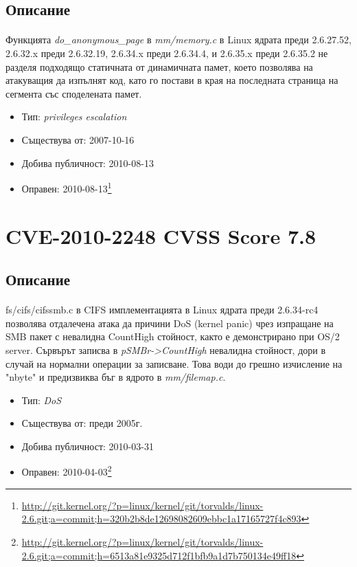 \documentclass[a4paper,12pt,leqno]{article}
\begin{document}
\subsection{Описание}
\paragraph{}
Функцията \textit{do\_anonymous\_page} в \textit{mm/memory.c} в Linux ядрата преди 2.6.27.52, 2.6.32.x преди 2.6.32.19, 2.6.34.x преди 2.6.34.4, и 2.6.35.x преди 2.6.35.2 не разделя подходящо статичната от динамичната памет, което позволява на атакуващия да изпълнят код, като го постави в края на последната страница на сегмента със споделената памет.

\begin{itemize}
    \item Тип: \textit{privileges escalation}
    \item Съществува от: 2007-10-16
  	\item Добива публичност: 2010-08-13
    \item Оправен: 2010-08-13\footnote{\url{http://git.kernel.org/?p=linux/kernel/git/torvalds/linux-2.6.git;a=commit;h=320b2b8de12698082609ebbc1a17165727f4c893}}
\end{itemize}

\section{CVE-2010-2248 CVSS Score 7.8}
\subsection{Описание}
\paragraph{}
fs/cifs/cifssmb.c в CIFS имплементацията в Linux ядрата преди 2.6.34-rc4 позволява отдалечена атака да причини DoS (kernel panic) чрез изпращане на SMB пакет с невалидна CountHigh стойност, както е демонстрирано при OS/2 server. Сървърът записва в \textit{pSMBr->CountHigh} невалидна стойност, дори в случай на нормални операции за записване. Това води до грешно изчисление на "nbyte" и предизвиква бъг в ядрото в \textit{mm/filemap.c}.


\begin{itemize}
    \item Тип: \textit{DoS}
    \item Съществува от: преди 2005г.
  	\item Добива публичност: 2010-03-31
    \item Оправен: 2010-04-03\footnote{\url{http://git.kernel.org/?p=linux/kernel/git/torvalds/linux-2.6.git;a=commit;h=6513a81e9325d712f1bfb9a1d7b750134e49ff18}}
\end{itemize}
\end{document}
